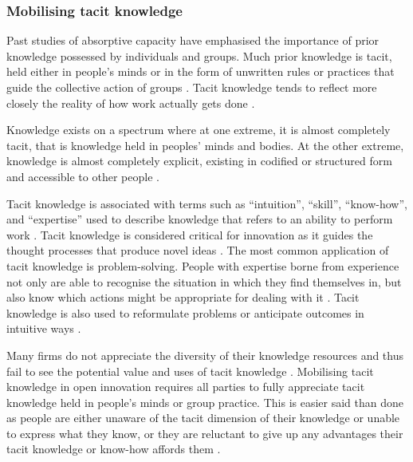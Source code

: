 \subsubsection{Mobilising tacit knowledge}

Past studies of absorptive capacity have emphasised the importance of prior knowledge possessed by individuals and groups. Much prior knowledge is tacit, held either in people's minds or in the form of unwritten rules or practices that guide the collective action of groups \citep{mowery1996strategic,leonard1998role,horvath2000working,burt2007secondhand,nonaka2009perspective,goksel2016can,lichtenthaler2016absorptive}. Tacit knowledge tends to reflect more closely the reality of how work actually gets done \citep{horvath2000working}. \medskip

Knowledge exists on a spectrum where at one extreme, it is almost completely tacit, that is knowledge held in peoples' minds and bodies. At the other extreme, knowledge is almost completely explicit, existing in codified or structured form and accessible to other people \citep{polanyi1966tacit,inkpen1998knowledge,leonard1998role,cavusgil2003tacit}.  \medskip

Tacit knowledge is associated with terms such as \enquote{intuition}, \enquote{skill}, \enquote{know-how}, and \enquote{expertise} used to describe knowledge that refers to an ability to perform work \citep{mcadam2007exploring}. Tacit knowledge is considered critical for innovation as it guides the thought processes that produce novel ideas \citep{leonard1998role,amar2008descriptive}. The most common application of tacit knowledge is problem-solving. People with expertise borne from experience not only are able to recognise the situation in which they find themselves in, but also know which actions might be appropriate for dealing with it \citep{simon1971human,leonard1998role}. Tacit knowledge is also used to reformulate problems or anticipate outcomes in intuitive ways \citep{leonard1998role}. \medskip

Many firms do not appreciate the diversity of their knowledge resources and thus fail to see the potential value and uses of tacit knowledge \citep{nonaka1994dynamic,horvath2000working}. Mobilising tacit knowledge in open innovation requires all parties to fully appreciate tacit knowledge held in people's minds or group practice. This is easier said than done as people are either unaware of the tacit dimension of their knowledge or unable to express what they know, or they are reluctant to give up any advantages their tacit knowledge or know-how affords them \citep{polanyi1966tacit,leonard1998role,eraut2000non}. \medskip

